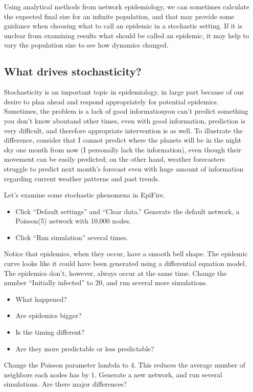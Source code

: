\documentclass{article}
\begin{document}
Using analytical methods from network epidemiology, we can sometimes calculate the expected final size for an infinite population, and that may provide some guidance when choosing what to call an epidemic in a stochastic setting.  If it is unclear from examining results what should be called an epidemic, it may help to vary the population size to see how dynamics changed.


\subsection{What drives stochasticity?}
Stochasticity is an important topic in epidemiology, in large part because of our desire to plan ahead and respond appropriately for potential epidemics.  Sometimes, the problem is a lack of good information\textemdash you can't predict something you don't know about\textemdash and other times, even with good information, prediction is very difficult, and therefore appropriate intervention is as well.  To illustrate the difference, consider that I cannot predict where the planets will be in the night sky one month from now (I personally lack the information), even though their movement can be easily predicted; on the other hand, weather forecasters struggle to predict next month's forecast even with huge amount of information regarding current weather patterns and past trends.

Let's examine some stochastic phenomena in EpiFire.
\begin{itemize}
 \item Click ``Default settings'' and ``Clear data.''  Generate the default network, a Poisson(5) network with 10,000 nodes.
 \item Click ``Run simulation'' several times.
\end{itemize}

Notice that epidemics, when they occur, have a smooth bell shape.  The epidemic curve looks like it could have been generated using a differential equation model. The epidemics don't, however, always occur at the same time. Change the number ``Initially infected'' to 20, and run several more simulations.  
\begin{itemize}

 \item What happened?  
 \item Are epidemics bigger?  
 \item Is the timing different?  
 \item Are they more predictable or less predictable?
\end{itemize}
Change the Poisson parameter lambda to 4.  This reduces the average number of neighbors each nodes has by 1.  Generate a new network, and run several simulations.  Are there major differences?
\end{document}
